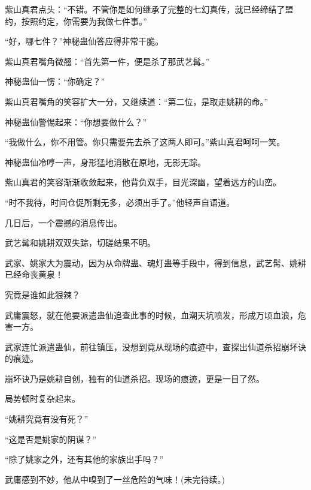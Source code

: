 \begin{this_body}
紫山真君点头：“不错。不管你是如何继承了完整的七幻真传，就已经缔结了盟约，按照约定，你需要为我做七件事。”

“好，哪七件？”神秘蛊仙答应得非常干脆。

紫山真君嘴角微翘：“首先第一件，便是杀了那武艺髯。”

神秘蛊仙一愣：“你确定？”

紫山真君嘴角的笑容扩大一分，又继续道：“第二位，是取走姚耕的命。”

神秘蛊仙警惕起来：“你想要做什么？”

“我做什么，你不用管。你只需要先去杀了这两人即可。”紫山真君呵呵一笑。

神秘蛊仙冷哼一声，身形猛地消散在原地，无影无踪。

紫山真君的笑容渐渐收敛起来，他背负双手，目光深幽，望着远方的山峦。

“时不我待，时间仓促所剩无多，必须出手了。”他轻声自语道。

几日后，一个震撼的消息传出。

武艺髯和姚耕双双失踪，切磋结果不明。

武家、姚家大为震动，因为从命牌蛊、魂灯蛊等手段中，得到信息，武艺髯、姚耕已经命丧黄泉！

究竟是谁如此狠辣？

武庸震怒，就在他要派遣蛊仙追查此事的时候，血潮天坑喷发，形成万顷血浪，危害一方。

武家连忙派遣蛊仙，前往镇压，没想到竟从现场的痕迹中，查探出仙道杀招崩坏诀的痕迹。

崩坏诀乃是姚耕自创，独有的仙道杀招。现场的痕迹，更是一目了然。

局势顿时复杂起来。

“姚耕究竟有没有死？”

“这是否是姚家的阴谋？”

“除了姚家之外，还有其他的家族出手吗？”

武庸感到不妙，他从中嗅到了一丝危险的气味！(未完待续。)

\end{this_body}

